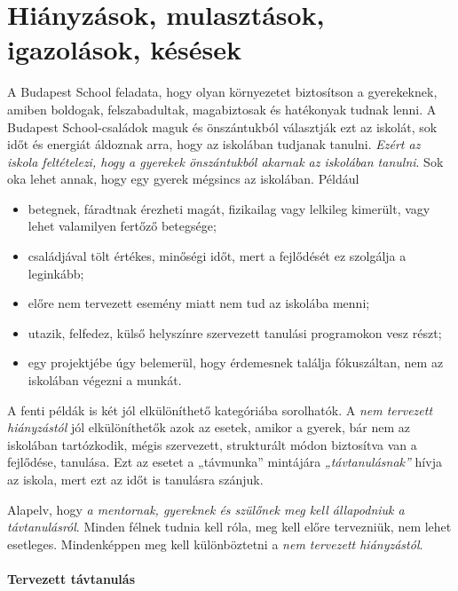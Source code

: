 \hypertarget{hianyzasok-mulasztasok-igazolasok-kesesek}{%
\section{Hiányzások, mulasztások, igazolások,
késések}\label{hianyzasok-mulasztasok-igazolasok-kesesek}}

A Budapest School feladata, hogy olyan környezetet biztosítson a
gyerekeknek, amiben boldogak, felszabadultak, magabiztosak és hatékonyak
tudnak lenni. A Budapest School-családok maguk és önszántukból választják
ezt az iskolát, sok időt és energiát áldoznak arra, hogy az iskolában
tudjanak tanulni. \emph{Ezért az iskola feltételezi, hogy a gyerekek
önszántukból akarnak az
iskolában tanulni}.
\newpage
Sok oka lehet annak, hogy egy gyerek mégsincs az iskolában. Például

\begin{itemize}
\tightlist
\item
  betegnek, fáradtnak érezheti magát, fizikailag vagy lelkileg kimerült,
  vagy lehet valamilyen fertőző betegsége;
\item
  családjával tölt értékes, minőségi időt, mert a fejlődését ez szolgálja
  a leginkább;
\item
  előre nem tervezett esemény miatt nem tud az iskolába menni;
\item
  utazik, felfedez, külső helyszínre szervezett tanulási programokon
  vesz részt;
\item
  egy projektjébe úgy belemerül, hogy érdemesnek találja fókuszáltan, nem az
  iskolában végezni a munkát.
\end{itemize}

A fenti példák is két jól elkülöníthető kategóriába sorolhatók. A
\emph{nem tervezett hiányzástól} jól elkülöníthetők azok az esetek,
amikor a gyerek, bár nem az iskolában tartózkodik, mégis szervezett,
strukturált módon biztosítva van a fejlődése, tanulása. Ezt az esetet a
„távmunka'' mintájára \emph{„távtanulásnak''} hívja az iskola,
mert ezt az időt is tanulásra szánjuk.

Alapelv, hogy \emph{a mentornak, gyereknek és szülőnek meg kell
állapodniuk a távtanulásról}. Minden félnek tudnia kell róla, meg kell
előre tervezniük, nem lehet esetleges. Mindenképpen meg kell
különböztetni a \emph{nem tervezett hiányzástól}.

\hypertarget{tervezett-tavtanulas}{%
\paragraph{Tervezett távtanulás}\label{tervezett-tavtanulas}}

